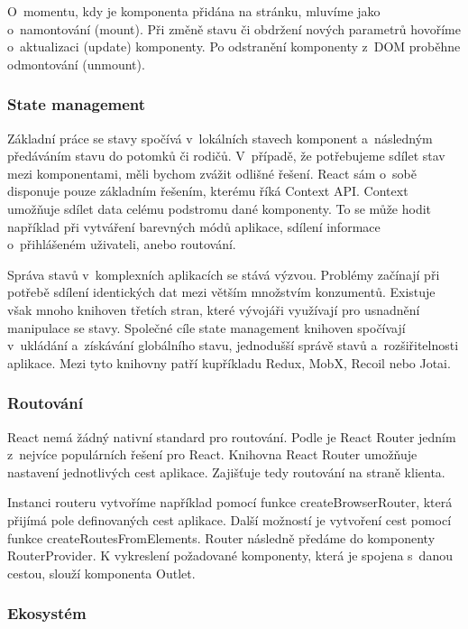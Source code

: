 O~momentu, kdy je komponenta přidána na stránku, mluvíme jako o~namontování (mount). Při změně stavu či obdržení nových parametrů hovoříme o~aktualizaci (update) komponenty. 
Po odstranění komponenty z~DOM proběhne odmontování (unmount).\cite{reactlifecycle, react}

\subsubsection{State management}

Základní práce se stavy spočívá v~lokálních stavech komponent a~následným předáváním stavu do potomků či rodičů. 
V~případě, že potřebujeme sdílet stav mezi komponentami, měli bychom zvážit odlišné řešení. React sám o~sobě disponuje pouze základním řešením, kterému říká Context API. 
Context umožňuje sdílet data celému podstromu dané komponenty. 
To se může hodit například při vytváření barevných módů aplikace, sdílení informace o~přihlášeném uživateli, anebo routování.\cite{react}

Správa stavů v~komplexních aplikacích se stává výzvou. Problémy začínají při potřebě sdílení identických dat mezi větším množstvím konzumentů. 
Existuje však mnoho knihoven třetích stran, které vývojáři využívají pro usnadnění manipulace se stavy. 
Společné cíle state management knihoven spočívají v~ukládání a~získávání globálního stavu, jednodušší správě stavů a~rozšiřitelnosti aplikace.
Mezi tyto knihovny patří kupříkladu Redux, MobX, Recoil nebo Jotai.\cite{statemanagementreact,reactstatemanagement}

\subsubsection{Routování}

React nemá žádný nativní standard pro routování. Podle \cite{reactbanks} je React Router jedním z~nejvíce populárních řešení pro React. 
Knihovna React Router umožňuje nastavení jednotlivých cest aplikace. Zajišťuje tedy routování na straně klienta.

Instanci routeru vytvoříme například pomocí funkce createBrowserRouter, která přijímá pole definovaných cest aplikace. 
Další možností je vytvoření cest pomocí funkce createRoutesFromElements. Router následně předáme do komponenty RouterProvider. 
K vykreslení požadované komponenty, která je spojena s~danou cestou, slouží komponenta Outlet.\cite{reactbanks,reactrouter}

\subsubsection{Ekosystém}

